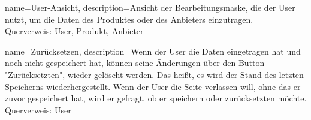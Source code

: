 {
  name=User-Ansicht,
  description={Ansicht der Bearbeitungsmaske, die der User nutzt, um die Daten des Produktes oder des Anbieters einzutragen. \\ Querverweis: User, Produkt, Anbieter}
}

{
  name=Zurücksetzen,
  description={Wenn der User die Daten eingetragen hat und noch nicht gespeichert hat, können seine Änderungen über den Button "Zurücksetzten", wieder gelöscht werden. Das heißt, es wird der Stand des letzten Speicherns wiederhergestellt. Wenn der User die Seite verlassen will, ohne das er zuvor gespeichert hat, wird er gefragt, ob er speichern oder zurücksetzten möchte. \\ Querverweis: User}
}

 

\glsaddall
\printglossaries

